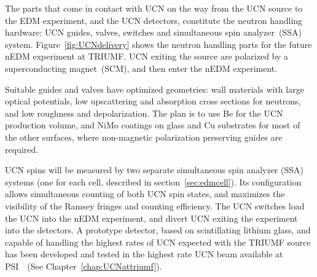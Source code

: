 The parts that come in contact with UCN on the way from the UCN source
to the EDM experiment, and the UCN detectors, constitute the neutron
handling hardware: UCN guides, valves, switches and simultaneous spin
analyzer~(SSA) system. Figure~\ref{fig:UCNdelivery} shows the neutron
handling parts for the future nEDM experiment at TRIUMF.  UCN exiting
the source are polarized by a superconducting magnet~(SCM), and then
enter the nEDM experiment.

Suitable guides and valves have optimized geometries: wall materials
with large optical potentials, low upscattering and absorption cross
sections for neutrons, and low roughness and depolarization. The plan
is to use Be for the UCN production volume, and NiMo coatings on glass
and Cu substrates for most of the other surfaces, where non-magnetic
polarization preserving guides are required.

UCN spins will be measured by two separate simultaneous spin analyzer
(SSA) systems (one for each cell, described in
section~\ref{sec:edmcell}). Its configuration allows simultaneous
counting of both UCN spin states, and maximizes the visibility of the
Ramsey fringes and counting efficiency.  The UCN switches load the UCN
into the nEDM experiment, and divert UCN exiting the experiment into
the detectors.  A prototype detector, based on scintillating lithium
glass, and capable of handling the highest rates of UCN expected with
the TRIUMF source has been developed and tested in the highest rate
UCN beam available at PSI~\cite{jamieson2017characterization}~(See
Chapter~\ref{chap:UCNattriumf}).





